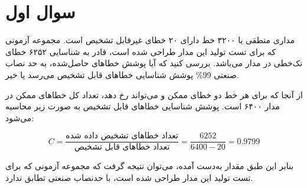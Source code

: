 \section{سوال اول}

مداری منطقی با ۳۲۰۰ خط دارای ۲۰ خطای  غیرقابل تشخیص است. مجموعه آزمونی که برای تست تولید این مدار طراحی شده است، قادر به شناسایی ۶۲۵۲ خطای  تک‌خطی در مدار می‌باشد. بررسی کنید که آیا پوشش خطاهای حاصل‌شده، به حد نصاب صنعتی 99\% پوشش شناسایی خطاهای قابل تشخیص می‌رسد یا خیر.




\begin{qsolve}
	از آنجا که برای هر خط دو خطای ممکن  و  می‌تواند رخ دهد، تعداد کل خطاهای ممکن در مدار ۶۴۰۰ است. پوشش شناسایی خطاهای قابل تشخیص به صورت زیر محاسبه می‌شود:
	
	\[
	C = \frac{\text{تعداد خطاهای تشخیص داده شده}}{\text{تعداد خطاهای قابل تشخیص}} = \frac{6252}{6400 - 20} = 0.9799
	\]
	
	بنابر این طبق مقدار به‌دست آمده، می‌توان نتیجه گرفت که مجموعه آزمونی که برای تست تولید این مدار طراحی شده است، با حدنصاب صنعتی تطابق ندارد.
\end{qsolve}




